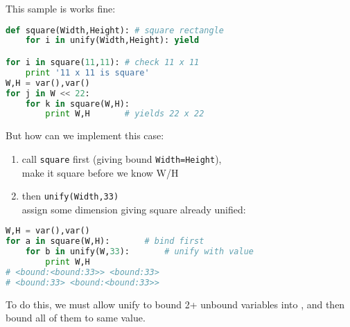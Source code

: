 This sample is works fine:
\begin{lstlisting}[language=Python]
def square(Width,Height): # square rectangle
	for i in unify(Width,Height): yield

for i in square(11,11):	# check 11 x 11
	print '11 x 11 is square'
W,H = var(),var()
for j in W << 22:
	for k in square(W,H):
		print W,H		# yields 22 x 22
\end{lstlisting}
But how can we implement this case:
\begin{enumerate}[nosep]
	\item call \verb|square| first (giving bound \verb|Width=Height|),\\
		make it square before we know W/H
	\item then \verb|unify(Width,33)|\\
		assign some dimension giving square already unified:
\end{enumerate}
\begin{lstlisting}[language=Python]
W,H = var(),var()
for a in square(W,H):		# bind first
	for b in unify(W,33):		# unify with value
		print W,H
# <bound:<bound:33>> <bound:33>
# <bound:33> <bound:<bound:33>>
\end{lstlisting}
To do this, we must allow unify to bound 2+ unbound variables into
, and then bound all of them to same value.

